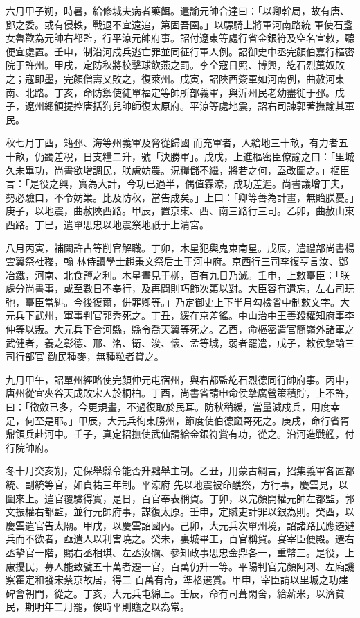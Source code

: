 \begin{pinyinscope}
 六月甲子朔，時暑，給修城夫病者藥餌。遣諭元帥合達曰：「以卿幹局，故有唐、鄧之委。或有侵軼，戰退不宜遠追，第固吾圉。」以驃騎上將軍河南路統
 軍使石盞女魯歡為元帥右都監，行平涼元帥府事。詔付遼東等處行省金銀符及空名宣敕，聽便宜處置。壬申，制沿河戍兵逃亡罪並同征行軍人例。詔御史中丞完顏伯嘉行樞密院于許州。甲戌，定防秋將校擊球飲燕之罰。李全寇日照、博興，紇石烈萬奴敗之；寇即墨，完顏僧壽又敗之，復萊州。戊寅，詔陜西簽軍如河南例，曲赦河東南、北路。丁亥，命防禦使徒單福定等帥所部義軍，與沂州民老幼盡徙于邳。戊子，遼州總領提控唐括狗兒帥師復太原府。平涼等處地震，詔右司諫郭著撫諭其軍民。



 秋七月丁酉，籍邳、海等州義軍及脅從歸國
 而充軍者，人給地三十畝，有力者五十畝，仍蠲差稅，日支糧二升，號「決勝軍」。戊戌，上進樞密臣僚諭之曰：「里城久未畢功，尚書欲增調民，朕慮妨農。況糧儲不繼，將若之何，盍改圖之。」樞臣言：「是役之興，實為大計，今功已過半，偶值霖潦，成功差遲。尚書議增丁夫，勢必驗口，不令妨業。比及防秋，當告成矣。」上曰：「卿等善為計畫，無貽朕憂。」庚子，以地震，曲赦陜西路。甲辰，置京東、西、南三路行三司。乙卯，曲赦山東西路。丁巳，遣單思忠以地震祭地祇于上清宮。



 八月丙寅，補闕許古等削官解職。丁卯，木星犯輿鬼東南星。戊辰，遣禮部尚書楊雲翼祭社稷，翰
 林侍讀學士趙秉文祭后土于河中府。京西行三司李復亨言汝、鄧冶鐵，河南、北食鹽之利。木星晝見于柳，百有九日乃滅。壬申，上敕臺臣：「朕處分尚書事，或至數日不奉行，及再問則巧飾次第以對。大臣容有遺忘，左右司玩弛，臺臣當糾。今後復爾，併罪卿等。」乃定御史上下半月勾檢省中制敕文字。大元兵下武州，軍事判官郭秀死之。丁丑，緩在京差徭。中山治中王善殺權知府事李仲等以叛。大元兵下合河縣，縣令喬天翼等死之。乙酉，命樞密遣官簡嶺外諸軍之武健者，養之彰德、邢、洺、衛、浚、懷、孟等城，弱者罷遣，戊子，敕侯摯諭三司行部官
 勸民種麥，無種粒者貸之。



 九月甲午，詔單州經略使完顏仲元屯宿州，與右都監紇石烈德同行帥府事。丙申，唐州從宜夾谷天成敗宋人於桐柏。丁酉，尚書省請申命侯摯廣營策積貯，上不許，曰：「徵斂已多，今更規畫，不過復取於民耳。防秋稍緩，當量減戍兵，用度幸足，何至是耶。」甲辰，大元兵徇東勝州，節度使伯德窳哥死之。庚戌，命行省胥鼎領兵赴河中。壬子，真定招撫使武仙請給金銀符賞有功，從之。沿河造戰艦，付行院帥府。



 冬十月癸亥朔，定保舉縣令能否升黜舉主制。乙丑，用蒙古綱言，招集義軍各置都統、副統等官，如貞祐三年制。平涼府
 先以地震被命醮祭，方行事，慶雲見，以圖來上。遣官覆驗得實，是日，百官奉表稱賀。丁卯，以完顏開權元帥左都監，郭文振權右都監，並行元帥府事，謀復太原。壬申，定贓吏計罪以銀為則。癸酉，以慶雲遣官告太廟。甲戌，以慶雲詔國內。己卯，大元兵次單州境，詔諸路民應遷避兵而不欲者，亟遣人以利害曉之。癸未，裏城畢工，百官稱賀。宴宰臣便殿。遷右丞摯官一階，賜右丞相琪、左丞汝礪、參知政事思忠金鼎各一，重幣三。是役，上慮擾民，募人能致甓五十萬者遷一官，百萬仍升一等。平陽判官完顏阿剌、左廂譏察霍定和發宋蔡京故居，得二
 百萬有奇，準格遷賞。甲申，宰臣請以里城之功建碑會朝門，從之。丁亥，大元兵屯綿上。壬辰，命有司葺閑舍，給薪米，以濟貧民，期明年二月罷，俟時平則贍之以為常。




\end{pinyinscope}

